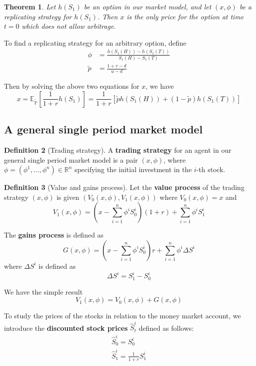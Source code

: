 \documentclass[10pt, oneside, reqno]{amsart}
\theoremstyle{plain}%
\newtheorem{thm}{Theorem}[subsection]
\theoremstyle{definition}
\newtheorem{defn}[thm]{Definition}
\theoremstyle{remark}
\newcommand{\R}{\mathbb{R}}
\newcommand{\tilp}{\tilde{p}}
\newcommand{\rnm}{\tilde{\mathbb{P}}}
\begin{document}
\begin{thm}
    Let $h(S_1)$ be an option in our market model, and let $(x,\phi)$ be a replicating strategy for $h(S_1)$. Then $x$ is the only price for the option at time $t=0$ which does not allow arbitrage.  
\end{thm}


To find a replicating strategy for an arbitrary option, define \begin{align*}
    \phi &= \frac{h(S_1(H)) - h(S_1(T))}{S_1(H) - S_1(T)} \\
    \tilp &= \frac{1 + r - d}{u - d}
\end{align*}

Then by solving the above two equations for $x$, we have \[
    x = \mathbb{E}_{\rnm}\left[\frac{1}{1+r} h(S_1)\right] = \frac{1}{1+r}\left[\tilp h(S_1(H)) + (1-\tilp) h(S_1(T))\right]
\]



\subsection{A general single period market model} %
\label{sub:a_general_single_period_market_model}


\begin{defn}[Trading strategy]
    A \textbf{trading strategy} for an agent in our general single period market model is a pair $(x,\phi)$, where $\phi = (\phi^1, \dots,\phi^n) \in \R^n$ specifying the initial investment in the $i$-th stock.
\end{defn}


\begin{defn}[Value and gains process]
    Let the \textbf{value process} of the trading strategy $(x,\phi)$ is given $(V_0(x,\phi), V_1(x,\phi))$ where $V_0(x,\phi) = x$ and \[
        V_1(x,\phi) = (x - \sum_{i=1}^n \phi^i S_0^i)(1+r) + \sum_{i=1}^n \phi^i S_1^i
    \]

    The \textbf{gains process} is defined as \[
        G(x,\phi) = (x - \sum_{i=1}^n \phi^i S^i_0) r + \sum_{i=1}^n \phi^i \Delta S^i
    \]
    where $\Delta S^i$ is defined as \[
        \Delta S^i = S^i_1 - S^i_0
    \]
\end{defn}

We have the simple result \[
    V_1(x,\phi) = V_0(x,\phi) + G(x,\phi)
\]

To study the prices of the stocks in relation to the money market account, we introduce the \textbf{discounted stock prices} $\hat{S}^i_t$ defined as follows: \begin{align*}
    \hat{S}^i_0 = S^i_0 \\
    \hat{S}^i_1 = \frac{1}{1+r} S^i_1
\end{align*}
\end{document}
